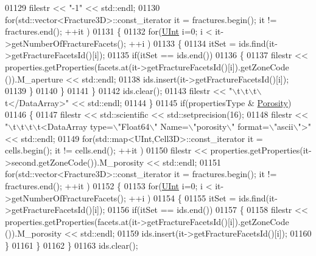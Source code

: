 \begin{DoxyCode}
01129             filestr << \textcolor{stringliteral}{"-1"} << std::endl;
01130         \textcolor{keywordflow}{for}(std::vector<Fracture3D>::const\_iterator it = fractures.begin(); it != fractures.end(); ++it )
01131         \{
01132             \textcolor{keywordflow}{for}(\hyperlink{namespaceFVCode3D_a4bf7e328c75d0fd504050d040ebe9eda}{UInt} i=0; i < it->getNumberOfFractureFacets(); ++i )
01133             \{
01134                 itSet = ids.find(it->getFractureFacetsId()[i]);
01135                 \textcolor{keywordflow}{if}(itSet == ids.end())
01136                 \{
01137                     filestr << properties.getProperties(facets.at(it->getFractureFacetsId()[i]).getZoneCode
      ()).M\_aperture << std::endl;
01138                     ids.insert(it->getFractureFacetsId()[i]);
01139                 \}
01140             \}
01141         \}
01142         ids.clear();
01143         filestr << \textcolor{stringliteral}{"\(\backslash\)t\(\backslash\)t\(\backslash\)t\(\backslash\)t</DataArray>"} << std::endl;
01144     \}
01145     \textcolor{keywordflow}{if}(propertiesType & \hyperlink{namespaceFVCode3D_ab3abc77722284ce4344be90bb61c1a41a8bb92532e203b2a2b45c4b2ce0354a90}{Porosity})
01146     \{
01147         filestr << std::scientific << std::setprecision(16);
01148         filestr << \textcolor{stringliteral}{"\(\backslash\)t\(\backslash\)t\(\backslash\)t\(\backslash\)t<DataArray type=\(\backslash\)"Float64\(\backslash\)" Name=\(\backslash\)"porosity\(\backslash\)" format=\(\backslash\)"ascii\(\backslash\)">"} << std::endl;
01149         \textcolor{keywordflow}{for}(std::map<UInt,Cell3D>::const\_iterator it = cells.begin(); it != cells.end(); ++it )
01150             filestr << properties.getProperties(it->second.getZoneCode()).M\_porosity << std::endl;
01151         \textcolor{keywordflow}{for}(std::vector<Fracture3D>::const\_iterator it = fractures.begin(); it != fractures.end(); ++it )
01152         \{
01153             \textcolor{keywordflow}{for}(\hyperlink{namespaceFVCode3D_a4bf7e328c75d0fd504050d040ebe9eda}{UInt} i=0; i < it->getNumberOfFractureFacets(); ++i )
01154             \{
01155                 itSet = ids.find(it->getFractureFacetsId()[i]);
01156                 \textcolor{keywordflow}{if}(itSet == ids.end())
01157                 \{
01158                     filestr << properties.getProperties(facets.at(it->getFractureFacetsId()[i]).getZoneCode
      ()).M\_porosity << std::endl;
01159                     ids.insert(it->getFractureFacetsId()[i]);
01160                 \}
01161             \}
01162         \}
01163         ids.clear();

\end{DoxyCode}
